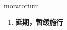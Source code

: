 
\begin{frame}
{\huge moratorium}
\begin{center}
\begin{enumerate}\Large
  \item \textbf{延期，暂缓施行}
\end{enumerate}
\end{center}
\end{frame}
